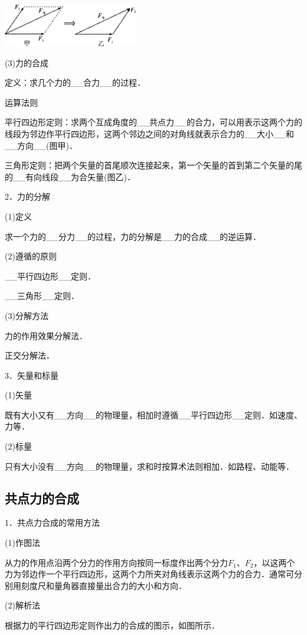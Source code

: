\begin{center}\includegraphics[width=2.3125in,height=0.72917in]{media/image61.png}\end{center}
(3)力的合成

定义：求几个力的\_\_合力\_\_的过程．

运算法则

平行四边形定则：求两个互成角度的\_\_共点力\_\_的合力，可以用表示这两个力的线段为邻边作平行四边形，这两个邻边之间的对角线就表示合力的\_\_大小\_\_和\_\_方向\_\_(图甲)．

三角形定则：把两个矢量的首尾顺次连接起来，第一个矢量的首到第二个矢量的尾的\_\_有向线段\_\_为合矢量(图乙)．

2．力的分解

(1)定义

求一个力的\_\_分力\_\_的过程，力的分解是\_\_力的合成\_\_的逆运算．

(2)遵循的原则

\_\_平行四边形\_\_定则．

\_\_三角形\_\_定则．

(3)分解方法

力的作用效果分解法．

正交分解法．

3．矢量和标量

(1)矢量

既有大小又有\_\_方向\_\_的物理量，相加时遵循\_\_平行四边形\_\_定则．如速度、力等．

(2)标量

只有大小没有\_\_方向\_\_的物理量，求和时按算术法则相加．如路程、动能等．
\newpage
\subsection{共点力的合成}

1．共点力合成的常用方法

(1)作图法

从力的作用点沿两个分力的作用方向按同一标度作出两个分力$F_1$、$F_2$，以这两个力为邻边作一个平行四边形，这两个力所夹对角线表示这两个力的合力．通常可分别用刻度尺和量角器直接量出合力的大小和方向．

(2)解析法

根据力的平行四边形定则作出力的合成的图示，如图所示．

